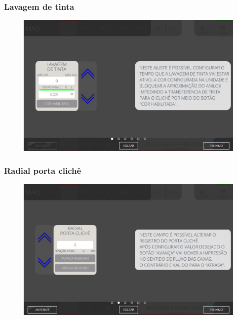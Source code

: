 \subsubsection{\small{Lavagem de tinta}} \label{sec:telaAjustesImpressoraLavagemDeTinta}
\vspace*{\fill}
\begin{figure}[h]
    \centering
    \includegraphics[width=576 px,height=360 px]{src/imagesICV/04-printters/02-printter/settings/e-1.png}
\end{figure}
\vspace*{\fill}

\newpage
\thispagestyle{fancy}
\vspace*{\fill}
\subsubsection{\small{Radial porta clichê}} \label{sec:telaAjustesImpressoraRadialPortaCliche}
\vspace*{\fill}
\begin{figure}[h]
    \centering
    \includegraphics[width=576 px,height=360 px]{src/imagesICV/04-printters/02-printter/settings/e-2.png}
\end{figure}
\vspace*{\fill}

